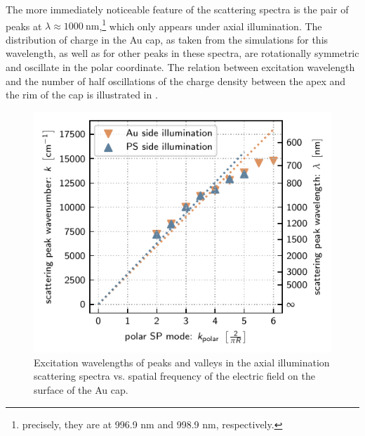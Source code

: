 \documentclass[10pt]{article}
\newcommand{\reffig}[2]{\mbox{\sffamily{Figure \ref{#1}#2}}}
\begin{document}
\begin{multicols}{2}

The more immediately noticeable feature of the scattering spectra is the pair of peaks at $\lambda\approx\SI{1000}{\nano\meter}$,\footnote{precisely, they are at 996.9 nm and 998.9 nm, respectively.} which only appears under axial illumination. 
The distribution of charge in the Au cap, as taken from the simulations for this wavelength, as well as for other peaks in these spectra, are rotationally symmetric and oscillate in the polar coordinate. 
The relation between excitation wavelength and the number of half oscillations of the charge density between the apex and the rim of the cap is illustrated in \reffig{fig:polar-plasmon-modes}{}. 

\begin{figure}[b!]
    \centering
    \includegraphics[width=\columnwidth]{polar plasmon orders (inverse, toporder=2)}
    \caption{
        Excitation wavelengths of peaks and valleys in the axial illumination scattering spectra vs. spatial frequency of the electric field on the surface of the Au cap. 
    }
    \label{fig:polar-plasmon-modes}
\end{figure}


\end{multicols}
\end{document}
